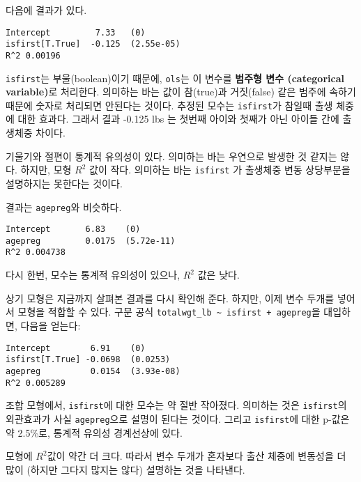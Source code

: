 다음에 결과가 있다.

\begin{verbatim}
Intercept         7.33   (0)
isfirst[T.True]  -0.125  (2.55e-05)
R^2 0.00196
\end{verbatim}

{\tt isfirst}는 부울(boolean)이기 때문에, 
{\tt ols}는 이 변수를 {\bf 범주형 변수 (categorical variable)}로 처리한다. 의미하는 바는 값이 참(true)과 거짓(false) 같은 범주에 속하기 때문에 숫자로 처리되면 안된다는 것이다.
추정된 모수는 {\tt isfirst}가 참일때 출생 체중에 대한 효과다. 그래서 결과 -0.125 lbs 는 첫번째 아이와 첫째가 아닌 아이들 간에 출생체중 차이다.

기울기와 절편이 통계적 유의성이 있다. 의미하는 바는 우연으로 발생한 것 같지는 않다. 하지만, 모형 $R^2$ 값이 작다. 의미하는 바는 {\tt isfirst} 가 출생체중 변동 상당부분을 설명하지는 못한다는 것이다.

결과는 {\tt agepreg}와 비슷하다.

\begin{verbatim}
Intercept       6.83    (0)
agepreg         0.0175  (5.72e-11)
R^2 0.004738
\end{verbatim}

다시 한번, 모수는 통계적 유의성이 있으나, $R^2$ 값은 낮다.

상기 모형은 지금까지 살펴본 결과를 다시 확인해 준다. 하지만, 이제 변수 두개를 넣어서 모형을 적합할 수 있다. 구문 공식 \verb"totalwgt_lb ~ isfirst + agepreg"을 대입하면, 다음을 얻는다:

\begin{verbatim}
Intercept        6.91    (0)
isfirst[T.True] -0.0698  (0.0253)
agepreg          0.0154  (3.93e-08)
R^2 0.005289
\end{verbatim}

조합 모형에서, {\tt isfirst}에 대한 모수는 약 절반 작아졌다. 의미하는 것은 {\tt isfirst}의 외관효과가 사실 {\tt agepreg}으로 설명이 된다는 것이다.
그리고 {\tt isfirst}에 대한 p-값은 약 2.5\%로, 통계적 유의성 경계선상에 있다.

모형에 $R^2$값이 약간 더 크다. 따라서 변수 두개가 혼자보다 출산 체중에 변동성을 더 많이 (하지만 그다지 많지는 않다) 설명하는 것을 나타낸다.

